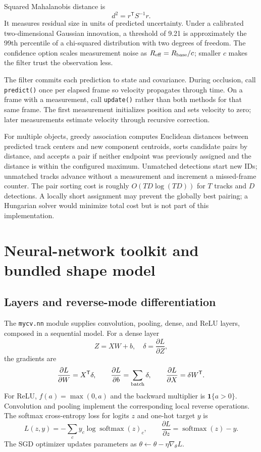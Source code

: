 \documentclass[11pt,a4paper]{article}
\DeclareMathOperator{\softmax}{softmax}
\newcommand{\1}{\mathbf{1}}
\begin{document}
Squared Mahalanobis distance is
\[
 d^2=r^{\mathsf T}S^{-1}r.
\]
It measures residual size in units of predicted uncertainty. Under a calibrated
two-dimensional Gaussian innovation, a threshold of 9.21 is approximately the
99th percentile of a chi-squared distribution with two degrees of freedom.
The confidence option scales measurement noise as
$R_{\rm eff}=R_{\rm base}/c$; smaller $c$ makes the filter trust the
observation less.

The filter commits each prediction to state and covariance. During occlusion,
call \texttt{predict()} once per elapsed frame so velocity propagates through time.
On a frame with a measurement, call \texttt{update()} rather than both methods for
that same frame. The first measurement initializes position and sets velocity
to zero; later measurements estimate velocity through recursive correction.

For multiple objects, greedy association computes Euclidean distances between
predicted track centers and new component centroids, sorts candidate pairs by
distance, and accepts a pair if neither endpoint was previously assigned and
the distance is within the configured maximum. Unmatched detections start new
IDs; unmatched tracks advance without a measurement and increment a
missed-frame counter. The pair sorting cost is roughly $O(TD\log(TD))$ for
$T$ tracks and $D$ detections. A locally short assignment may prevent the
globally best pairing; a Hungarian solver would minimize total cost but is not
part of this implementation.

\section{Neural-network toolkit and bundled shape model}

\subsection{Layers and reverse-mode differentiation}

The \texttt{mycv.nn} module supplies convolution, pooling, dense, and ReLU layers,
composed in a sequential model. For a dense layer
\[
 Z=XW+b,\quad \delta=\frac{\partial L}{\partial Z},
\]
the gradients are
\[
 \frac{\partial L}{\partial W}=X^{\mathsf T}\delta,\qquad
 \frac{\partial L}{\partial b}=\sum_{\rm batch}\delta,\qquad
 \frac{\partial L}{\partial X}=\delta W^{\mathsf T}.
\]
For ReLU, $f(a)=\max(0,a)$ and the backward multiplier is $\1\{a>0\}$.
Convolution and pooling implement the corresponding local reverse operations.
The softmax cross-entropy loss for logits $z$ and one-hot target $y$ is
\[
 L(z,y)=-\sum_c y_c\log\softmax(z)_c,
 \qquad \frac{\partial L}{\partial z}=\softmax(z)-y.
\]
The SGD optimizer updates parameters as $\theta\leftarrow\theta-\eta\nabla_\theta L$.
\end{document}
